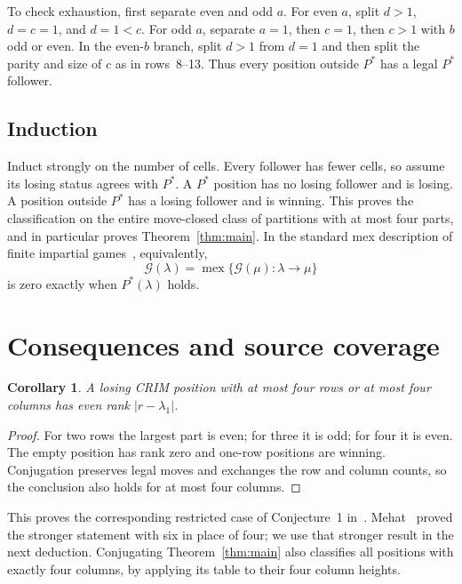 \documentclass[11pt]{article}
\newtheorem{corollary}[theorem]{Corollary}
\newcommand{\G}{\mathcal G}
\begin{document}
To check exhaustion, first separate even and odd $a$.
For even $a$, split $d>1$, $d=c=1$, and $d=1<c$.
For odd $a$, separate $a=1$, then $c=1$, then $c>1$ with $b$ odd
or even. In the even-$b$ branch, split $d>1$ from $d=1$ and then
split the parity and size of $c$ as in rows~8--13.
Thus every position outside $P^*$ has a legal $P^*$ follower.

\subsection{Induction}
Induct strongly on the number of cells.
Every follower has fewer cells, so assume its losing status agrees with
$P^*$. A $P^*$ position has no losing follower and is losing.
A position outside $P^*$ has a losing follower and is winning.
This proves the classification on the entire move-closed class of
partitions with at most four parts, and in particular proves
Theorem~\ref{thm:main}. In the standard mex description of finite
impartial games~\cite[\S6, Satz~I]{Sprague}, equivalently,
\[
 \G(\lambda)=\operatorname{mex}\{\G(\mu):\lambda\longrightarrow\mu\}
\]
is zero exactly when $P^*(\lambda)$ holds.

\section{Consequences and source coverage}
\begin{corollary}\label{cor:rank}
A losing CRIM position with at most four rows or at most four columns
has even rank $|r-\lambda_1|$.
\end{corollary}
\begin{proof}
For two rows the largest part is even; for three it is odd; for four
it is even. The empty position has rank zero and one-row positions
are winning. Conjugation preserves legal moves and exchanges the row
and column counts, so the conclusion also holds for at most four columns.
\end{proof}
This proves the corresponding restricted case of Conjecture~1
in~\cite{BGK}. Mehat~\cite[Corollary~3, p.~2; Section~9, p.~10]{Mehat}
proved the stronger statement with six in place of four; we use that
stronger result in the next deduction.
Conjugating Theorem~\ref{thm:main} also classifies all positions with
exactly four columns, by applying its table to their four column heights.
\end{document}
